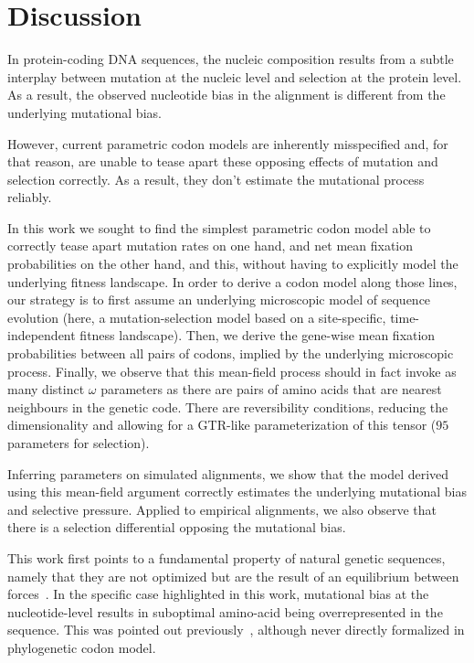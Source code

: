 \documentclass{article}
\begin{document}
\section{Discussion}\label{sec:discussion}

In protein-coding {DNA} sequences, the nucleic composition results from a subtle interplay between mutation at the nucleic level and selection at the protein level.
As a result, the observed nucleotide bias in the alignment is different from the underlying mutational bias.

However, current parametric codon models are inherently misspecified and, for that reason, are unable to tease apart these opposing effects of mutation and selection correctly.
As a result, they don't estimate the mutational process reliably.

In this work we sought to find the simplest parametric codon model able to correctly tease apart mutation rates on one hand, and net mean fixation probabilities on the other hand, and this, without having to explicitly model the underlying fitness landscape.
In order to derive a codon model along those lines, our strategy is to first assume an underlying microscopic model of sequence evolution (here, a mutation-selection model based on a site-specific, time-independent fitness landscape).
Then, we derive the gene-wise mean fixation probabilities between all pairs of codons, implied by the underlying microscopic process.
Finally, we observe that this mean-field process should in fact invoke as many distinct $\omega$ parameters as there are pairs of amino acids that are nearest neighbours in the genetic code.
There are reversibility conditions, reducing the dimensionality and allowing for a GTR-like parameterization of this tensor ($95$ parameters for selection).

Inferring parameters on simulated alignments, we show that the model derived using this mean-field argument correctly estimates the underlying mutational bias and selective pressure.
Applied to empirical alignments, we also observe that there is a selection differential opposing the mutational bias.

This work first points to a fundamental property of natural genetic sequences, namely that they are not optimized but are the result of an equilibrium between forces~\citep{Sella2005}.
In the specific case highlighted in this work, mutational bias at the nucleotide-level results in suboptimal amino-acid being overrepresented in the sequence.
This was pointed out previously~\citep{Singer2000}, although never directly formalized in phylogenetic codon model.
\end{document}
